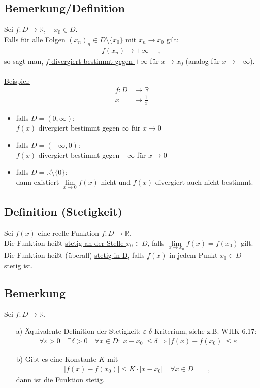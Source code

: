 \documentclass[12pt, titlepage]{article}
\newcommand{\R}{\mathds{R}}
\renewcommand{\>}{\rightarrow}
\renewcommand{\*}{\cdot}
\renewcommand{\epsilon}{\varepsilon}
\begin{document}
	\subsection{Bemerkung/Definition}
	Sei $f\colon D\>\R,\quad x_0\in\overline{D}$.\\
	Falls für alle Folgen $(x_n)_n\in D\setminus\{x_0\}$ mit $x_n\> x_0$ gilt:
	\begin{align*}
		f(x_n)\> \pm\infty\quad\textrm{ , }
	\end{align*}
	so sagt man, \underline{$f$ divergiert bestimmt gegen $\pm\infty$} für $x\> x_0$ (analog für $x\>\pm\infty$).\\
	\\
	\underline{Beispiel:}
	\begin{align*}
		f\colon D&\>\R\\
		x&\mapsto\frac{1}{x}
	\end{align*}
	\begin{itemize}
		\item falls $D=(0,\infty)$:\\
		$f(x)$ divergiert bestimmt gegen $\infty$ für $x\> 0$ 
		\item falls $D=(-\infty,0)$:\\
		$f(x)$ divergiert bestimmt gegen $-\infty$ für $x\> 0$
		\item falls $D=\R\setminus\{0\}$:\\
		dann existiert $\lim\limits_{x\>0}f(x)$ nicht und $f(x)$ divergiert auch nicht bestimmt.
	\end{itemize}
	\subsection{Definition (Stetigkeit)}
	Sei $f(x)$ eine reelle Funktion $f\colon D\>\R$.\\
	Die Funktion heißt \underline{stetig an der Stelle $x_0\in D$}, falls $\lim\limits_{x\> x_0}f(x)=f(x_0)$ gilt.\\
	Die Funktion heißt (überall) \underline{stetig in D}, falls $f(x)$ in jedem Punkt $x_0\in D$ stetig ist.
	\subsection{Bemerkung}
	Sei $f\colon D\>\R$.
	\begin{itemize}
		\item[a)] Äquivalente Definition der Stetigkeit: $\epsilon$-$\delta$-Kriterium, siehe z.B. WHK 6.17:
		\begin{align*}
			\forall\epsilon>0\quad\exists\delta>0\quad\forall x\in D\colon|x-x_0|\leq\delta\Rightarrow|f(x)-f(x_0)|\leq\epsilon
		\end{align*}
		\item[b)] Gibt es eine Konstante $K$ mit
		\begin{align*}
			|f(x)-f(x_0)|\leq K\*|x-x_0|\quad\forall x\in D\qquad\textrm{, }
		\end{align*}
		dann ist die Funktion stetig.
	\end{itemize}
\end{document}
